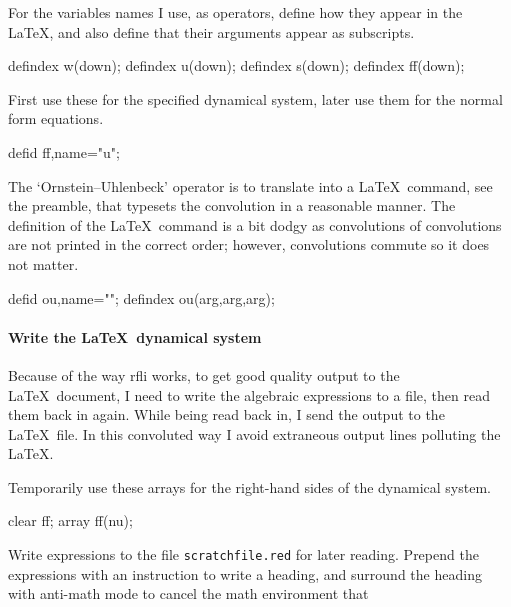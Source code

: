 \documentclass[11pt,a5paper]{article}
\def\ou\big(#1,#2,#3\big)%
\begin{document}
For the variables names I use, as operators, define how they
appear in the \LaTeX, and also define that their arguments
appear as subscripts.
\begin{reduce}
defindex w(down);
defindex u(down);
defindex s(down);
defindex ff(down);
\end{reduce}

First use these for the specified dynamical system, later
use them for the normal form equations.
\begin{reduce}
defid ff,name="\dot u";
\end{reduce}

The `Ornstein--Uhlenbeck' operator is to translate into a
\LaTeX\ command, see the preamble, that typesets the
convolution in a reasonable manner. The definition of the
\LaTeX\ command is a bit dodgy as convolutions of
convolutions are not printed in the correct order; however, 
convolutions commute so it does not matter.
\begin{reduce}
defid ou,name="\ou";
defindex ou(arg,arg,arg);
\end{reduce}


\paragraph{Write the \LaTeX\ dynamical system}

Because of the way rfli works, to get good quality output to
the \LaTeX\ document, I need to write the algebraic
expressions to a file, then read them back in again. While
being read back in, I send the output to the \LaTeX\ file.
In this convoluted way I avoid extraneous output lines
polluting the \LaTeX. 

Temporarily use these arrays for the right-hand sides of the
dynamical system.
\begin{reduce}
clear ff;
array ff(nu);
\end{reduce}

Write expressions to the file \verb|scratchfile.red| for
later reading. Prepend the expressions with an instruction
to write a heading, and surround the heading with anti-math
mode to cancel the math environment that 
\end{document}
